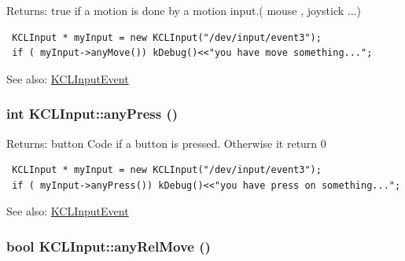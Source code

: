 \begin{Desc}
\item[Returns:]true if a motion is done by a motion input.( mouse , joystick ...) 

\begin{Code}\begin{verbatim} KCLInput * myInput = new KCLInput("/dev/input/event3");
 if ( myInput->anyMove()) kDebug()<<"you have move something...";
\end{verbatim}
\end{Code}

 \end{Desc}
\begin{Desc}
\item[See also:]\hyperlink{class_k_c_l_input_event}{KCLInputEvent} \end{Desc}
\hypertarget{class_k_c_l_input_9489641a8f669dc73ee86120a6e02adc}{
\subsubsection[{anyPress}]{\setlength{\rightskip}{0pt plus 5cm}int KCLInput::anyPress ()}}
\label{class_k_c_l_input_9489641a8f669dc73ee86120a6e02adc}


\begin{Desc}
\item[Returns:]button Code if a button is pressed. Otherwise it return 0 

\begin{Code}\begin{verbatim} KCLInput * myInput = new KCLInput("/dev/input/event3");
 if ( myInput->anyPress()) kDebug()<<"you have press on something...";
\end{verbatim}
\end{Code}

 \end{Desc}
\begin{Desc}
\item[See also:]\hyperlink{class_k_c_l_input_event}{KCLInputEvent} \end{Desc}
\hypertarget{class_k_c_l_input_c7eb85203b40fc1fd3d6ac65788b79b4}{
\subsubsection[{anyRelMove}]{\setlength{\rightskip}{0pt plus 5cm}bool KCLInput::anyRelMove ()}}
\label{class_k_c_l_input_c7eb85203b40fc1fd3d6ac65788b79b4}


